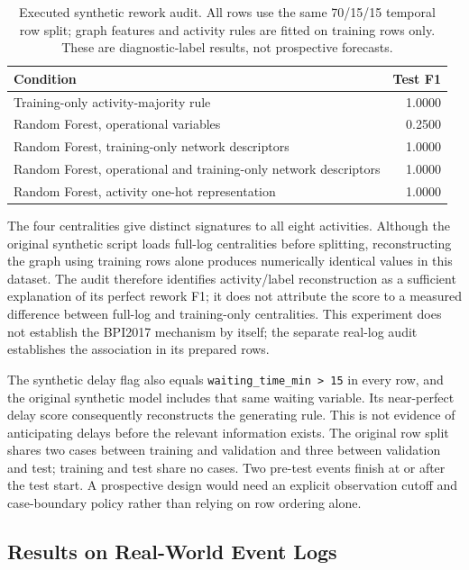\begin{table}[t]
\caption{Executed synthetic rework audit. All rows use the same 70/15/15 temporal row split; graph features and activity rules are fitted on training rows only. These are diagnostic-label results, not prospective forecasts.}
\label{tab:synthetic_audit}
\centering\small
\begin{tabular}{lr}
\toprule
Condition & Test F1\\
\midrule
Training-only activity-majority rule & 1.0000\\
Random Forest, operational variables & 0.2500\\
Random Forest, training-only network descriptors & 1.0000\\
Random Forest, operational and training-only network descriptors & 1.0000\\
Random Forest, activity one-hot representation & 1.0000\\
\bottomrule
\end{tabular}
\end{table}

The four centralities give distinct signatures to all eight activities. Although the original synthetic script loads full-log centralities before splitting, reconstructing the graph using training rows alone produces numerically identical values in this dataset. The audit therefore identifies activity/label reconstruction as a sufficient explanation of its perfect rework F1; it does not attribute the score to a measured difference between full-log and training-only centralities. This experiment does not establish the BPI2017 mechanism by itself; the separate real-log audit establishes the association in its prepared rows.

The synthetic delay flag also equals \texttt{waiting\_time\_min > 15} in every row, and the original synthetic model includes that same waiting variable. Its near-perfect delay score consequently reconstructs the generating rule. This is not evidence of anticipating delays before the relevant information exists. The original row split shares two cases between training and validation and three between validation and test; training and test share no cases. Two pre-test events finish at or after the test start. A prospective design would need an explicit observation cutoff and case-boundary policy rather than relying on row ordering alone.

\subsection{Results on Real-World Event Logs}
\label{subsec:real_results}

